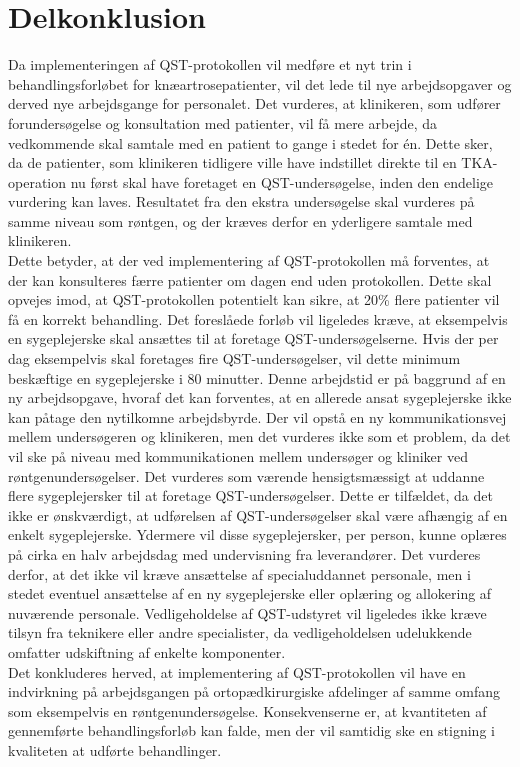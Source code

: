\section{Delkonklusion}
Da implementeringen af QST-protokollen vil medføre et nyt trin i behandlingsforløbet for knæartrosepatienter, vil det lede til nye arbejdsopgaver og derved nye arbejdsgange for personalet. Det vurderes, at klinikeren, som udfører forundersøgelse og konsultation med patienter, vil få mere arbejde, da vedkommende skal samtale med en patient to gange i stedet for én. Dette sker, da de patienter, som klinikeren tidligere ville have indstillet direkte til en TKA-operation nu først skal have foretaget en QST-undersøgelse, inden den endelige vurdering kan laves. Resultatet fra den ekstra undersøgelse skal vurderes på samme niveau som røntgen, og der kræves derfor en yderligere samtale med klinikeren. \\
Dette betyder, at der ved implementering af QST-protokollen må forventes, at der kan konsulteres færre patienter om dagen end uden protokollen. Dette skal opvejes imod, at QST-protokollen potentielt kan sikre, at 20\% flere patienter vil få en korrekt behandling. Det foreslåede forløb vil ligeledes kræve, at eksempelvis en sygeplejerske skal ansættes til at foretage QST-undersøgelserne. Hvis der per dag eksempelvis skal foretages fire QST-undersøgelser, vil dette minimum beskæftige en sygeplejerske i 80 minutter. Denne arbejdstid er på baggrund af en ny arbejdsopgave, hvoraf det kan forventes, at en allerede ansat sygeplejerske ikke kan påtage den nytilkomne arbejdsbyrde. Der vil opstå en ny kommunikationsvej mellem undersøgeren og klinikeren, men det vurderes ikke som et problem, da det vil ske på niveau med kommunikationen mellem undersøger og kliniker ved røntgenundersøgelser. Det vurderes som værende hensigtsmæssigt at uddanne flere sygeplejersker til at foretage QST-undersøgelser. Dette er tilfældet, da det ikke er ønskværdigt, at udførelsen af QST-undersøgelser skal være afhængig af en enkelt sygeplejerske. Ydermere vil disse sygeplejersker, per person, kunne oplæres på cirka en halv arbejdsdag med undervisning fra leverandører. Det vurderes derfor, at det ikke vil kræve ansættelse af specialuddannet personale, men i stedet eventuel ansættelse af en ny sygeplejerske eller oplæring og allokering af nuværende personale. Vedligeholdelse af QST-udstyret vil ligeledes ikke kræve tilsyn fra teknikere eller andre specialister, da vedligeholdelsen udelukkende omfatter udskiftning af enkelte komponenter. \\
Det konkluderes herved, at implementering af QST-protokollen vil have en indvirkning på arbejdsgangen på ortopædkirurgiske afdelinger af samme omfang som eksempelvis en røntgenundersøgelse. Konsekvenserne er, at kvantiteten af gennemførte behandlingsforløb kan falde, men der vil samtidig ske en stigning i kvaliteten at udførte behandlinger.
